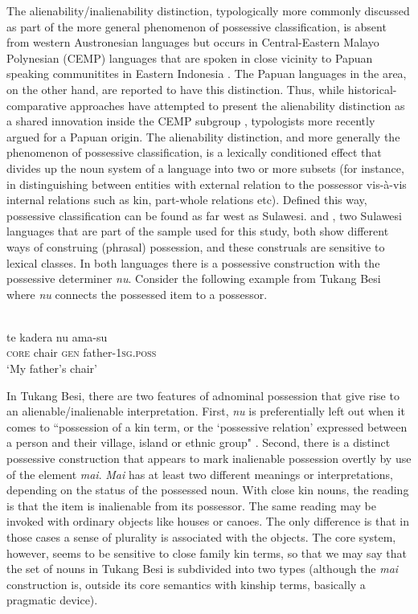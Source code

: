 The alienability/inalienability distinction, typologically more commonly discussed as part of the more general phenomenon of possessive classification, is absent from western Austronesian languages but occurs in Central-Eastern Malayo Polynesian (CEMP) languages that are spoken in close vicinity to Papuan speaking communitites in Eastern Indonesia \citep[116]{klamer2008east}. The Papuan languages in the area, on the other hand, are reported to have this distinction. Thus, while historical-comparative approaches have attempted to present the alienability distinction as a shared innovation inside the CEMP subgroup \citep{blust1993central}, typologists more recently argued for a Papuan origin. The alienability distinction, and more generally the phenomenon of possessive classification, is a lexically conditioned effect that divides up the noun system of a language into two or more subsets (for instance, in distinguishing between entities with external relation to the possessor vis-à-vis internal relations such as kin, part-whole relations etc). Defined this way, possessive classification can be found as far west as Sulawesi.  and , two Sulawesi languages that are part of the sample used for this study, both show different ways of construing (phrasal) possession, and these construals are sensitive to lexical classes. In both languages there is a possessive construction with the possessive determiner \textit{nu}. Consider the following example from Tukang Besi where \textit{nu} connects the possessed item to a possessor.

\ea \label{}
\\
\gll te kadera nu ama-su\\
\textsc{core} chair \textsc{gen} father-\textsc{1}\textsc{sg}.\textsc{poss}\\
\glt ‘My father's chair’
\z

In Tukang Besi, there are two features of adnominal possession that give rise to an alienable/inalienable interpretation. First, \textit{nu} is preferentially left out when it comes to ``possession of a kin term, or the `possessive relation' expressed between a person and their village, island or ethnic group" \citep[346]{donohue1999}. Second, there is a distinct possessive construction that appears to mark inalienable possession overtly by use of the element \textit{mai}. \textit{Mai} has at least two different meanings or interpretations, depending on the status of the possessed noun. With close kin nouns, the reading is that the item is inalienable from its possessor. The same reading may be invoked with ordinary objects like houses or canoes. The only difference is that in those cases a sense of plurality is associated with the objects. The core system, however, seems to be sensitive to close family kin terms, so that we may say that the set of nouns in Tukang Besi is subdivided into two types (although the \textit{mai} construction is, outside its core semantics with kinship terms, basically a pragmatic device). 

